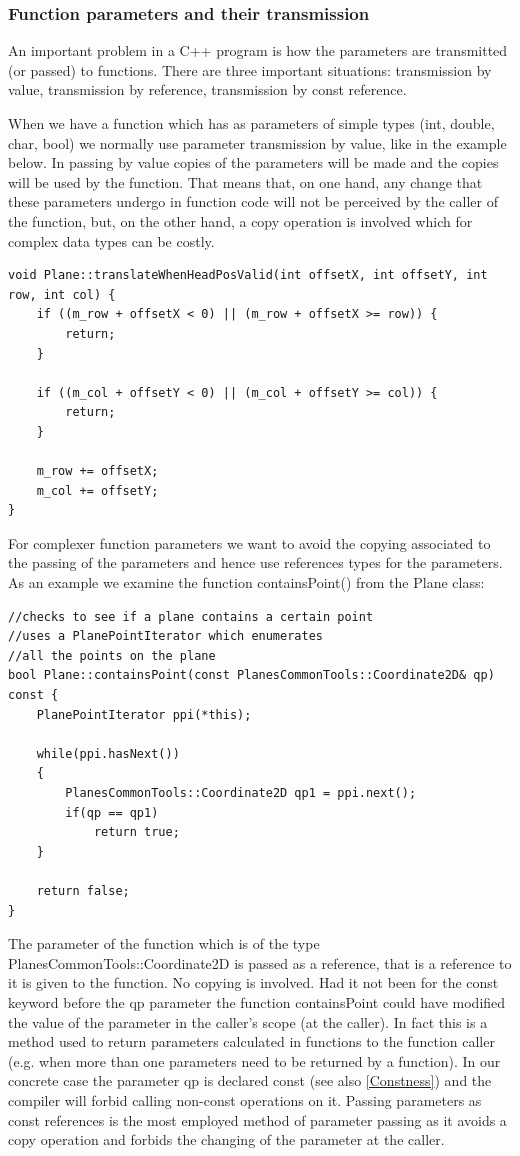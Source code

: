\subsubsection {Function parameters and their transmission}

An important problem in a C++ program is how the parameters are transmitted (or passed) to functions. There are three important situations: transmission by value, transmission by reference, transmission by const reference.  

When we have a function which has as parameters of simple types (int, double, char, bool) we normally use parameter transmission by value, like in the example below. In passing by value copies of the parameters will be made and the copies will be used by the function. That means that, on one hand, any change that these parameters undergo in function code will not be perceived by the caller of the function, but, on the other hand, a copy operation is involved which for complex data types can be costly.

\begin{lstlisting}
void Plane::translateWhenHeadPosValid(int offsetX, int offsetY, int row, int col) {
    if ((m_row + offsetX < 0) || (m_row + offsetX >= row)) {
        return;
    }

    if ((m_col + offsetY < 0) || (m_col + offsetY >= col)) {
        return;
    }

    m_row += offsetX;
    m_col += offsetY;
}
\end{lstlisting}

For complexer function parameters we want to avoid the copying associated to the passing of the parameters and hence use references types for the parameters. As an example we examine the function containsPoint() from the Plane class:

\begin{lstlisting}
//checks to see if a plane contains a certain point
//uses a PlanePointIterator which enumerates
//all the points on the plane
bool Plane::containsPoint(const PlanesCommonTools::Coordinate2D& qp) const {
    PlanePointIterator ppi(*this);

    while(ppi.hasNext())
    {
        PlanesCommonTools::Coordinate2D qp1 = ppi.next();
        if(qp == qp1)
            return true;
    }

    return false;
}
\end{lstlisting}

The parameter of the function which is of the type PlanesCommonTools::Coordinate2D is passed as a reference, that is a reference to it is given to the function. No copying is involved. Had it not been for the const keyword before the qp parameter the function containsPoint could have modified the value of the parameter in the caller's scope (at the caller). In fact this is a method used to return parameters calculated in functions to the function caller (e.g. when more than one parameters need to be returned by a function). In our concrete case the parameter qp is declared const (see also \ref {Constness}) and the compiler will forbid calling non-const operations on it. Passing parameters as const references is the most employed method of parameter passing as it avoids a copy operation and forbids the changing of the parameter at the caller.  